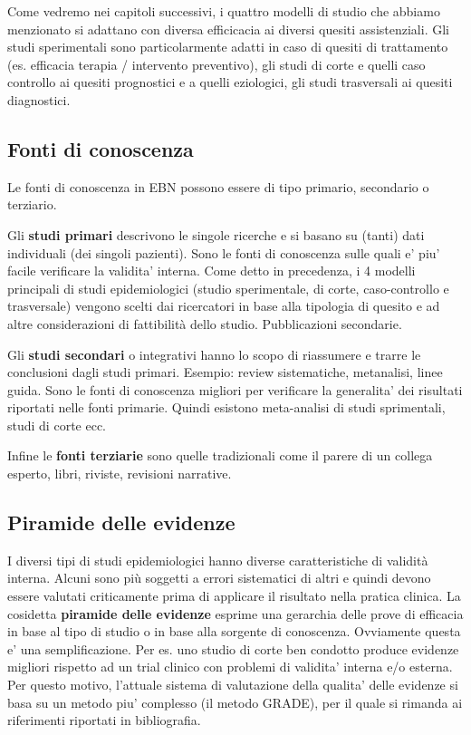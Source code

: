 \documentclass[]{book}
\begin{document}
Come vedremo nei capitoli successivi, i quattro modelli di studio che abbiamo menzionato si adattano con diversa efficicacia ai diversi quesiti assistenziali. Gli studi sperimentali sono particolarmente adatti in caso di quesiti di trattamento (es. efficacia terapia / intervento preventivo), gli studi di corte e quelli caso controllo ai quesiti prognostici e a quelli eziologici, gli studi trasversali ai quesiti diagnostici.

\hypertarget{fonti-di-conoscenza}{%
\subsection{Fonti di conoscenza}\label{fonti-di-conoscenza}}

Le fonti di conoscenza in EBN possono essere di tipo primario, secondario o terziario.

Gli \textbf{studi primari} descrivono le singole ricerche e si basano su (tanti) dati individuali (dei singoli pazienti). Sono le fonti di conoscenza sulle quali e' piu' facile verificare la validita' interna. Come detto in precedenza, i 4 modelli principali di studi epidemiologici (studio sperimentale, di corte, caso-controllo e trasversale) vengono scelti dai ricercatori in base alla tipologia di quesito e ad altre considerazioni di fattibilità dello studio.
Pubblicazioni secondarie.

Gli \textbf{studi secondari} o integrativi hanno lo scopo di riassumere e trarre le conclusioni dagli studi primari. Esempio: review sistematiche, metanalisi, linee guida. Sono le fonti di conoscenza migliori per verificare la generalita' dei risultati riportati nelle fonti primarie. Quindi esistono meta-analisi di studi sprimentali, studi di corte ecc.

Infine le \textbf{fonti terziarie} sono quelle tradizionali come il parere di un collega esperto, libri, riviste, revisioni narrative.

\hypertarget{piramide-delle-evidenze}{%
\subsection{Piramide delle evidenze}\label{piramide-delle-evidenze}}

I diversi tipi di studi epidemiologici hanno diverse caratteristiche di validità interna. Alcuni sono più soggetti a errori sistematici di altri e quindi devono essere valutati criticamente prima di applicare il risultato nella pratica clinica. La cosidetta \textbf{piramide delle evidenze} esprime una gerarchia delle prove di efficacia in base al tipo di studio o in base alla sorgente di conoscenza. Ovviamente questa e' una semplificazione. Per es. uno studio di corte ben condotto produce evidenze migliori rispetto ad un trial clinico con problemi di validita' interna e/o esterna. Per questo motivo, l'attuale sistema di valutazione della qualita' delle evidenze si basa su un metodo piu' complesso (il metodo GRADE), per il quale si rimanda ai riferimenti riportati in bibliografia.
\end{document}
